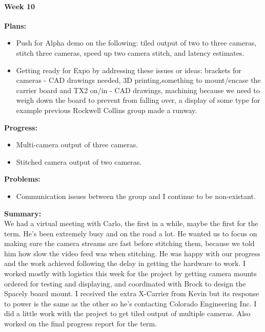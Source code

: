 \paragraph{Week 10}
\begin{adjustwidth}{2.5em}{0pt} 
    \vspace{-0.5cm}\textbf{Plans:}
    \vspace{-0.5cm}
    \begin{itemize}
        \item Push for Alpha demo on the following: tiled output of two to three cameras, stitch three cameras, speed up two camera stitch, and latency estimates.
    	\item Getting ready for Expo by addressing these issues or ideas: brackets for cameras - CAD drawings needed, 3D printing,something to mount/encase the carrier board and TX2 on/in - CAD drawings, machining because we need to weigh down the board to prevent from falling over, a display of some type for example previous Rockwell Collins group made a runway.
    \end{itemize} 
    \vspace{-0.3cm}\textbf{Progress:}
    \vspace{-0.5cm}
    \begin{itemize}
        \item Multi-camera output of three cameras.
		\item Stitched camera output of two cameras.
    \end{itemize} 
    \vspace{-0.3cm}\textbf{Problems:}
    \vspace{-0.5cm}
    \begin{itemize}
        \item Communication issues between the group and I continue to be non-existant. 
    \end{itemize} 
    \vspace{-0.3cm}\noindent\textbf{Summary:}\\
    \noindent We had a virtual meeting with Carlo, the first in a while, maybe the first for the term. He's been extremely busy and on the road a lot. He wanted us to focus on making sure the camera streams are fast before stitching them, because we told him how slow the video feed was when stitching. He was happy with our progress and the work achieved following the delay in getting the hardware to work. I worked mostly with logistics this week for the project by getting camera mounts ordered for testing and displaying, and coordinated with Brock to design the Spacely board mount. I received the extra X-Carrier from Kevin but its response to power is the same as the other so he's contacting Colorado Engineering Inc. I did a little work with the project to get tiled output of multiple cameras. Also worked on the final progress report for the term. 
\end{adjustwidth} 

